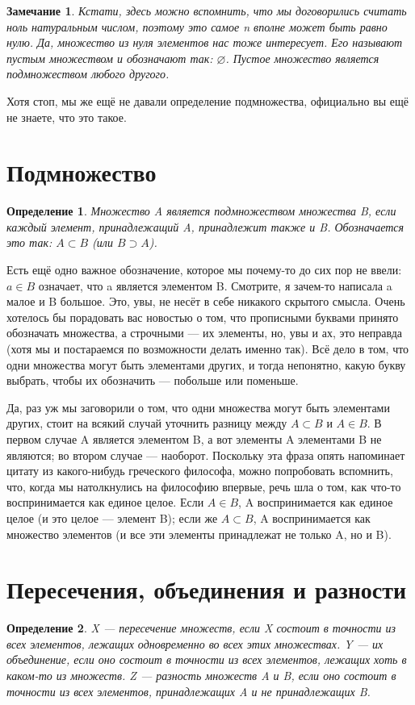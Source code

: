 \documentclass[12pt, onecolumn]{report}
\newtheorem{definition}{Определение}
\newtheorem*{remark}{Замечание}
\begin{document}
\begin{remark} Кстати, здесь можно вспомнить, что мы договорились считать ноль натуральным числом, поэтому это самое n вполне может быть равно нулю. Да, множество из нуля элементов нас тоже интересует. Его называют пустым множеством и обозначают так: $\varnothing$. Пустое множество является подмножеством любого другого.
\end{remark}
 Хотя стоп, мы же ещё не давали определение подмножества, официально вы ещё не знаете, что это такое.
\section{Подмножество}
\begin{definition}
Множество A является подмножеством множества B, если каждый элемент, принадлежащий A, принадлежит также и B. Обозначается это так: $A \subset B$ (или $B \supset A$).
\end{definition}
Есть ещё одно важное обозначение, которое мы почему-то до сих пор не ввели: $a \in B$ означает, что a является элементом B. Смотрите, я зачем-то написала a малое и B большое. Это, увы, не несёт в себе никакого скрытого смысла. Очень хотелось бы порадовать вас новостью о том, что прописными буквами принято обозначать множества, а строчными --- их элементы, но, увы и ах, это неправда (хотя мы и постараемся по возможности делать именно так). Всё дело в том, что одни множества могут быть элементами других, и тогда непонятно, какую букву выбрать, чтобы их обозначить --- побольше или поменьше.

Да, раз уж мы заговорили о том, что одни множества могут быть элементами других, стоит на всякий случай уточнить разницу между $A \subset B$ и $A \in B$. В первом случае A является элементом B, а вот элементы A элементами B не являются; во втором случае --- наоборот. Поскольку эта фраза опять напоминает цитату из какого-нибудь греческого философа, можно попробовать вспомнить, что, когда мы натолкнулись на философию впервые, речь шла о том, как что-то воспринимается как единое целое. Если $A \in B$, A воспринимается как единое целое (и это целое --- элемент B); если же $A \subset B$, A воспринимается как множество элементов (и все эти элементы принадлежат не только A, но и B).

\section{Пересечения, объединения и разности}
\begin{definition}
X --- пересечение множеств, если X состоит в точности из всех элементов, лежащих одновременно во всех этих множествах. Y --- их объединение, если оно состоит в точности из всех элементов, лежащих хоть в каком-то из множеств. Z --- разность множеств A и B, если оно состоит в точности из всех элементов, принадлежащих A и не принадлежащих B.
\end{definition}
\end{document}
